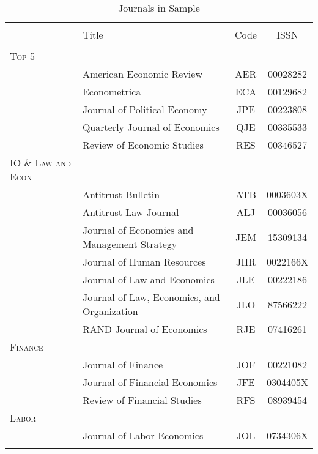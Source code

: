 \begin{table}[!h] \centering
    \caption{Journals in Sample}
    \label{}
\footnotesize
\begin{tabular}{@{\extracolsep{5pt}} llcc} 
\\[-1.8ex]\hline 
\hline \\[-1.8ex] 
 & Title & Code & ISSN  \\ 
\hline \\[-1.8ex] 
\textsc{Top 5} & & \\
& American Economic Review & AER & 00028282\\
& Econometrica & ECA & 00129682\\
& Journal of Political Economy & JPE & 00223808\\
& Quarterly Journal of Economics & QJE & 00335533\\
& Review of Economic Studies & RES & 00346527\\
\textsc{IO \& Law and Econ} & & \\
& Antitrust Bulletin & ATB & 0003603X\\
& Antitrust Law Journal & ALJ & 00036056\\
& Journal of Economics and Management Strategy & JEM & 15309134\\
& Journal of Human Resources & JHR & 0022166X\\
& Journal of Law and Economics & JLE & 00222186\\
& Journal of Law, Economics, and Organization & JLO & 87566222\\
& RAND Journal of Economics & RJE & 07416261\\
\textsc{Finance} & & \\
& Journal of Finance & JOF & 00221082\\
& Journal of Financial Economics & JFE & 0304405X\\
& Review of Financial Studies & RFS & 08939454\\
\textsc{Labor} & & \\
& Journal of Labor Economics & JOL & 0734306X\\
\hline \\[-1.8ex]
\end{tabular}
\end{table}